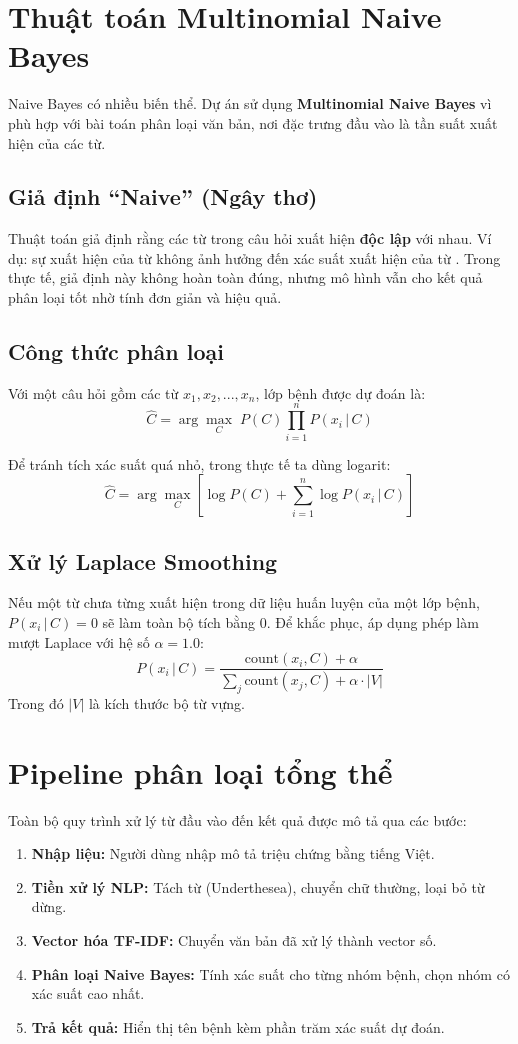 \documentclass[12pt,a4paper]{report}
\begin{document}
\section{Thuật toán Multinomial Naive Bayes}
Naive Bayes có nhiều biến thể. Dự án sử dụng \textbf{Multinomial Naive Bayes} vì phù hợp với bài toán phân loại văn bản, nơi đặc trưng đầu vào là tần suất xuất hiện của các từ.

\subsection{Giả định ``Naive'' (Ngây thơ)}
Thuật toán giả định rằng các từ trong câu hỏi xuất hiện \textbf{độc lập} với nhau. Ví dụ: sự xuất hiện của từ  không ảnh hưởng đến xác suất xuất hiện của từ . Trong thực tế, giả định này không hoàn toàn đúng, nhưng mô hình vẫn cho kết quả phân loại tốt nhờ tính đơn giản và hiệu quả.

\subsection{Công thức phân loại}
Với một câu hỏi gồm các từ $x_1, x_2, ..., x_n$, lớp bệnh được dự đoán là:
\[ \hat{C} = \arg\max_{C} \; P(C) \prod_{i=1}^{n} P(x_i \,|\, C) \]

Để tránh tích xác suất quá nhỏ, trong thực tế ta dùng logarit:
\[ \hat{C} = \arg\max_{C} \left[ \log P(C) + \sum_{i=1}^{n} \log P(x_i \,|\, C) \right] \]

\subsection{Xử lý Laplace Smoothing}
Nếu một từ chưa từng xuất hiện trong dữ liệu huấn luyện của một lớp bệnh, $P(x_i \,|\, C) = 0$ sẽ làm toàn bộ tích bằng 0. Để khắc phục, áp dụng phép làm mượt Laplace với hệ số $\alpha = 1.0$:
\[ P(x_i \,|\, C) = \frac{\text{count}(x_i, C) + \alpha}{\sum_{j} \text{count}(x_j, C) + \alpha \cdot |V|} \]
Trong đó $|V|$ là kích thước bộ từ vựng.

\section{Pipeline phân loại tổng thể}
Toàn bộ quy trình xử lý từ đầu vào đến kết quả được mô tả qua các bước:
\begin{enumerate}
    \item \textbf{Nhập liệu:} Người dùng nhập mô tả triệu chứng bằng tiếng Việt.
    \item \textbf{Tiền xử lý NLP:} Tách từ (Underthesea), chuyển chữ thường, loại bỏ từ dừng.
    \item \textbf{Vector hóa TF-IDF:} Chuyển văn bản đã xử lý thành vector số.
    \item \textbf{Phân loại Naive Bayes:} Tính xác suất cho từng nhóm bệnh, chọn nhóm có xác suất cao nhất.
    \item \textbf{Trả kết quả:} Hiển thị tên bệnh kèm phần trăm xác suất dự đoán.
\end{enumerate}
\end{document}
